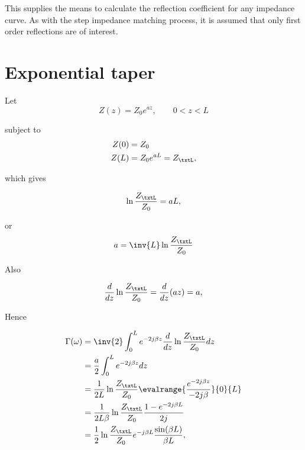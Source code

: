 This supplies the means to calculate the reflection coefficient for any impedance curve.  As with the step impedance matching process, it is assumed that only first order reflections are of interest.

\section{Exponential taper}

Let
\begin{equation}\label{eqn:continuumAndOtherTransformersCore:620}
Z(z) = Z_0 e^{a z}, \qquad 0 < z < L
\end{equation}

subject to
\begin{equation}\label{eqn:continuumAndOtherTransformersCore:640}
\begin{aligned}
Z(0) &= Z_0 \\
Z(L) &= Z_0 e^{a L} = Z_\txtL,
\end{aligned}
\end{equation}

which gives

\begin{equation}\label{eqn:continuumAndOtherTransformersCore:660}
\ln \frac{Z_\txtL}{Z_0} = a L,
\end{equation}

or
\begin{equation}\label{eqn:continuumAndOtherTransformersCore:680}
a = \inv{L} \ln \frac{Z_\txtL}{Z_0}
\end{equation}

Also

\begin{equation}\label{eqn:continuumAndOtherTransformersCore:700}
\frac{d}{dz} \ln \frac{Z_\txtL}{Z_0}
= \frac{d}{dz} (az)
= a,
\end{equation}

Hence

\begin{equation}\label{eqn:continuumAndOtherTransformersCore:740}
\begin{aligned}
\Gamma(\omega)
&= \inv{2} \int_0^L e^{-2 j \beta z} \frac{d}{dz} \ln \frac{Z_\txtL}{Z_0} dz
\\ &= \frac{a}{2}
\int_0^L e^{-2 j \beta z} dz
\\ &= \frac{1}{2L} \ln \frac{Z_\txtL}{Z_0}
\evalrange{ \frac{e^{-2 j \beta z} }{ -2 j \beta} }{0}{L}
\\ &= \frac{1}{2L \beta} \ln \frac{Z_\txtL}{Z_0}
\frac{ 1 - e^{-2 j \beta L} }{2 j}
\\ &= \frac{1}{2} \ln \frac{Z_\txtL}{Z_0} e^{-j \beta L} \frac{\sin( \beta L )}{\beta L},
\end{aligned}
\end{equation}

